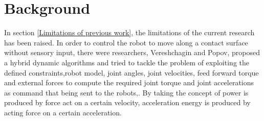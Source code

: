 \documentclass[report.tex]{subfiles}
\begin{document}
    \chapter{Background} \label{Background}
    In section \ref{Limitations of previous work}, the limitations of the current research has been raised. In order to control the robot to move along a contact surface without sensory input, there were researchers, Vereshchagin and Popov, proposed a hybrid dynamic algorithms and tried to tackle the problem of exploiting the defined constraints,robot model, joint angles, joint velocities, feed forward torque and external forces to compute the required joint torque and joint accelerations as command that being sent to the robots\cite{vereshchagin1989modeling},\cite{vereshchagin1974computer}. By taking the concept of power is produced by force act on a certain velocity, acceleration energy is produced by acting force on a certain acceleration.
\end{document}
